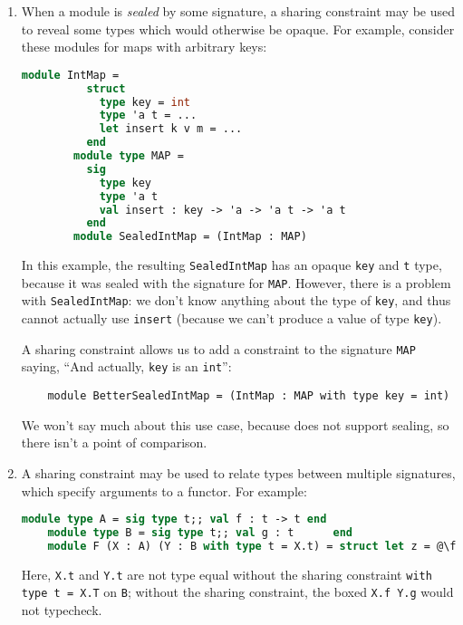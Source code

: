 \begin{enumerate}
    \item When a module is \emph{sealed} by some signature, a sharing
    constraint may be used to reveal some types which would otherwise
    be opaque. For example, consider these modules for maps with arbitrary
    keys:

\begin{lstlisting}[language=ML]
        module IntMap =
          struct
            type key = int
            type 'a t = ...
            let insert k v m = ...
          end
        module type MAP =
          sig
            type key
            type 'a t
            val insert : key -> 'a -> 'a t -> 'a t
          end
        module SealedIntMap = (IntMap : MAP)
\end{lstlisting}

    \noindent In this example, the resulting \verb|SealedIntMap| has
    an opaque \verb|key| and \verb|t| type, because it was sealed
    with the signature for \verb|MAP|.  However, there is a problem
    with \verb|SealedIntMap|: we don't
    know anything about the type of \verb|key|, and thus cannot actually
    use \verb|insert| (because we can't produce a value of type \verb|key|).

    A sharing constraint allows us to add a constraint to the signature \verb|MAP|
    saying, ``And actually, \verb|key| is an \verb|int|'':

\begin{lstlisting}
    module BetterSealedIntMap = (IntMap : MAP with type key = int)
\end{lstlisting}

    \noindent We won't say much about this use case, because \Backpack{} does
    not support sealing, so there isn't a point of comparison.

    \item A sharing constraint may be used to relate types between multiple
    signatures, which specify arguments to a functor.  For example:

\begin{lstlisting}[language=ML,escapechar=@]
    module type A = sig type t;; val f : t -> t end
    module type B = sig type t;; val g : t      end
    module F (X : A) (Y : B with type t = X.t) = struct let z = @\fbox{X.f Y.g}@ end
\end{lstlisting}

    Here, \verb|X.t| and \verb|Y.t| are not type equal without the
    sharing constraint \verb|with type t = X.T| on \verb|B|; without
    the sharing constraint, the boxed \verb|X.f Y.g| would not typecheck.

\end{enumerate}

